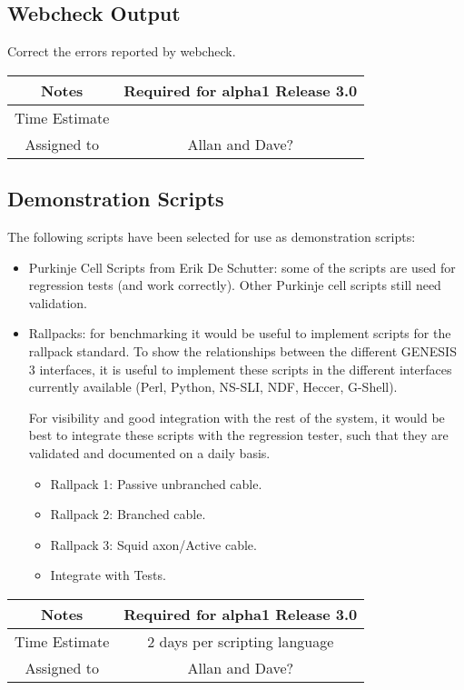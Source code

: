 \documentclass[12pt]{article}
\begin{document}
\subsection{Webcheck Output}

Correct the errors reported by webcheck.

{
  \vspace{5mm}
  \centering
  \begin{tabular}{|c|c|}
    \hline
    Notes
    & Required for alpha1 Release 3.0 \\
    \hline
    Time Estimate
    & \\
    \hline
    Assigned to
    & Allan and Dave? \\
    \hline
  \end{tabular}
}


\subsection{Demonstration Scripts}

The following scripts have been selected for use as demonstration
scripts:

\begin{itemize}
\item Purkinje Cell Scripts from Erik De Schutter: some of the scripts
  are used for regression tests (and work correctly).  Other Purkinje
  cell scripts still need validation.
\item Rallpacks: for benchmarking it would be useful to implement
  scripts for the rallpack standard.  To show the relationships
  between the different GENESIS\,3 interfaces, it is useful to
  implement these scripts in the different interfaces currently
  available (Perl, Python, NS-SLI, NDF, Heccer, G-Shell).

  For visibility and good integration with the rest of the system, it
  would be best to integrate these scripts with the regression tester,
  such that they are validated and documented on a daily basis.
  \begin{itemize}
  \item Rallpack 1: Passive unbranched cable.
  \item Rallpack 2: Branched cable.
  \item Rallpack 3: Squid axon/Active cable.
  \item Integrate with Tests.
  \end{itemize}
\end{itemize}

{
  \vspace{5mm}
  \centering
  \begin{tabular}{|c|c|}
    \hline
    Notes
    & Required for alpha1 Release 3.0 \\
    \hline
    Time Estimate
    & 2 days per scripting language \\
    \hline
    Assigned to
    & Allan and Dave? \\
    \hline
  \end{tabular}
}
\end{document}
